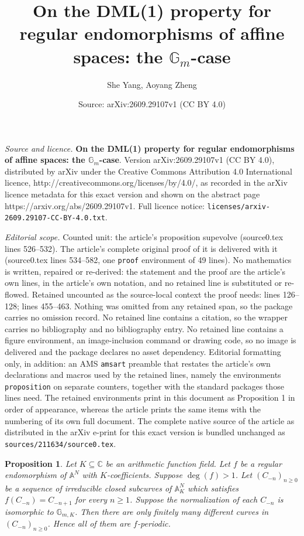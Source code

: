 \documentclass[10pt,a4paper]{amsart}
\title{\textbf{On the DML(1) property for regular endomorphisms of affine spaces: the $\mathbb{G}_m$-case}}
\author{She Yang, Aoyang Zheng}
\date{Source: arXiv:2609.29107v1 (CC BY 4.0)}
\newtheorem{proposition}{Proposition}
\begin{document}
\maketitle

\noindent\emph{Source and licence.} \textbf{On the DML(1) property for regular endomorphisms of affine spaces: the $\mathbb{G}_m$-case}. Version arXiv:2609.29107v1 (CC BY 4.0), distributed by arXiv under the Creative Commons Attribution 4.0 International licence, http://creativecommons.org/licenses/by/4.0/, as recorded in the arXiv licence metadata for this exact version and shown on the abstract page https://arxiv.org/abs/2609.29107v1. Full licence notice: \texttt{licenses/arxiv-2609.29107-CC-BY-4.0.txt}.\par\smallskip

\noindent\textit{Editorial scope.} Counted unit: the article's proposition supevolve (source0.tex lines 526--532). The article's complete original proof of it is delivered with it (source0.tex lines 534--582, one \texttt{proof} environment of 49 lines). No mathematics is written, repaired or re-derived: the statement and the proof are the article's own lines, in the article's own notation, and no retained line is substituted or re-flowed.  Retained uncounted as the source-local context the proof needs: lines 126--128; lines 455--463.  Nothing was omitted from any retained span, so the package carries no omission record.  No retained line contains a citation, so the wrapper carries no bibliography and no bibliography entry.  No retained line contains a figure environment, an image-inclusion command or drawing code, so no image is delivered and the package declares no asset dependency.  Editorial formatting only, in addition: an AMS \texttt{amsart} preamble that restates the article's own declarations and macros used by the retained lines, namely the environments \texttt{proposition} on separate counters, together with the standard packages those lines need.  The retained environments print in this document as Proposition 1 in order of appearance, whereas the article prints the same items with the numbering of its own full document.  The complete native source of the article as distributed in the arXiv e-print for this exact version is bundled unchanged as \texttt{sources/211634/source0.tex}.
\begin{proposition}\label{mainprop}
Let $K\subseteq\mathbb{C}$ be an arithmetic function field. Let $f$ be a regular endomorphism of $\mathbb{A}^N$ with $K$-coefficients. Suppose $\deg(f)>1$. Let $(C_{-n})_{n\geq0}$ be a sequence of irreducible closed subcurves of $\mathbb{A}_{K}^N$ which satisfies $f(C_{-n})=C_{-n+1}$ for every $n\geq1$. Suppose the normalization of each $C_{-n}$ is isomorphic to $\mathbb{G}_{m,K}$. Then there are only finitely many different curves in $(C_{-n})_{n\geq0}$. Hence all of them are $f$-periodic.
\end{proposition}
\end{document}
